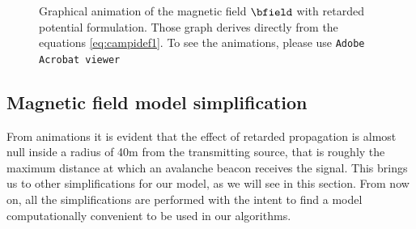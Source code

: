 \begin{figure}[p]
\label{fig:animazionifield}
 \newline
{}
 \newline
{} 
\caption{Graphical animation of the magnetic field $\bfield$ with retarded potential formulation. Those graph derives directly from the equations \ref{eq:campidef1}. To see the animations, please use \texttt{Adobe Acrobat viewer}}
\end{figure}

\subsection{Magnetic field model simplification}
From animations it is evident that the effect of retarded propagation is almost null inside a radius of \num{40}\si{\meter} from the transmitting source, that is roughly the maximum distance at which an avalanche beacon receives the signal. This brings us to other simplifications for our model, as we will see in this section. From now on, all the simplifications are performed with the intent to find a model computationally convenient to be used in our algorithms.

